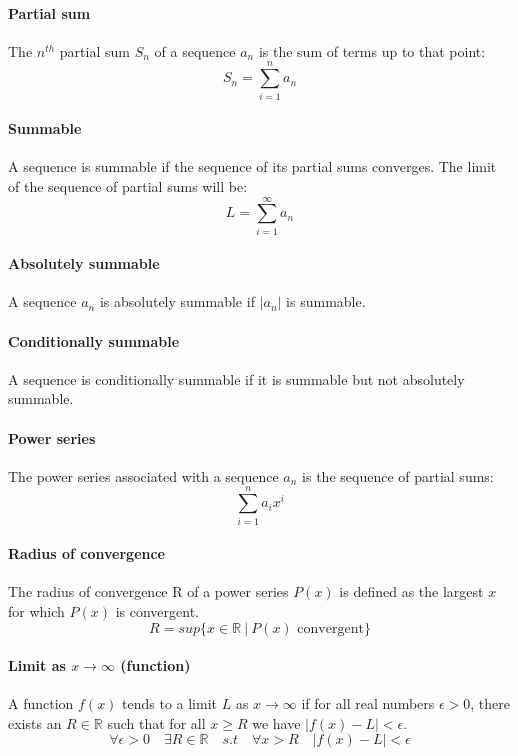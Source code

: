 \documentclass{article}
\newcommand{\R}{\mathbb{R}}
\begin{document}
\paragraph{Partial sum}
The $ n^{th} $ partial sum $ S_{n} $ of a sequence $ a_{n} $ is the sum of terms up to that point:
\begin{equation}
S_{n} = \sum_{i=1}^{n} a_{n}
\end{equation}
\paragraph{Summable}
A sequence is summable if the sequence of its partial sums converges. The limit of the sequence of partial sums will be:
\begin{equation}
L = \sum_{i=1}^{\infty} a_{n}
\end{equation}
\paragraph{Absolutely summable}
A sequence $ a_{n} $ is absolutely summable if $ |a_{n}| $ is summable.
\paragraph{Conditionally summable}
A sequence is conditionally summable if it is summable but not absolutely summable.
\paragraph{Power series}
The power series associated with a sequence $ a_{n} $ is the sequence of partial sums:
\begin{equation}
\sum_{i=1}^{n} a_{i}x^{i}
\end{equation}
\paragraph{Radius of convergence}
The radius of convergence R of a power series $ P(x) $ is defined as the largest $ x $ for which $ P(x) $ is convergent.
\begin{equation}
R = sup\{x \in \R \ | \ P(x) \textrm{ convergent}\}
\end{equation}
\paragraph{Limit as $ x \to \infty $ (function)}
A function $ f(x) $ tends to a limit $ L $ as $ x \to \infty $ if for all real numbers $ \epsilon > 0 $, there exists an $ R \in \R $ such that for all $ x \geq R $ we have $ |f(x) - L| < \epsilon $.
\begin{equation}
\forall \epsilon > 0 \quad \exists R \in \R \quad s.t \quad \forall x > R \quad |f(x) - L| < \epsilon
\end{equation}
\end{document}
